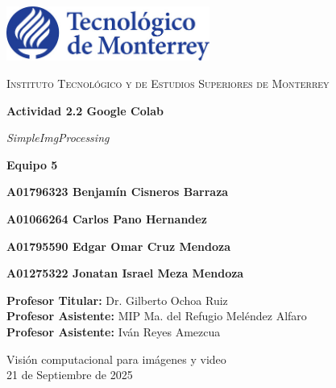 \documentclass[12pt,letterpaper]{article}
\begin{document}
\begin{titlepage}
  \centering
  \vspace*{0.5cm}
  \includegraphics[width=0.5\textwidth]{logo.jpg}\par
  \vspace{1.2cm}

  {\Large\scshape Instituto Tecnológico y de Estudios Superiores de Monterrey\par}
  \vspace{2.2cm}

  {\huge\bfseries Actividad 2.2 Google Colab\par
   \vspace{0.2cm}
   \emph{SimpleImgProcessing}\par}
  \vspace{2.2cm}

  {\Large\bfseries Equipo 5\par}
  {\normalsize\bfseries A01796323 Benjamín Cisneros Barraza\par}
  {\normalsize\bfseries A01066264 Carlos Pano Hernandez\par}
  {\normalsize\bfseries A01795590 Edgar Omar Cruz Mendoza\par}
  {\normalsize\bfseries A01275322 Jonatan Israel Meza Mendoza\par}
  
  \vspace{1.2cm}

  \begin{flushleft}
    \normalsize \textbf{Profesor Titular:} Dr. Gilberto Ochoa Ruiz\\
    \normalsize \textbf{Profesor Asistente:} MIP Ma. del Refugio Meléndez Alfaro\\
    \normalsize \textbf{Profesor Asistente:} Iván Reyes Amezcua
  \end{flushleft}

  \vfill

  \begin{flushright}
    \normalsize Visión computacional para imágenes y video\\
    \normalsize 21 de Septiembre de 2025
  \end{flushright}
\end{titlepage}
\end{document}
